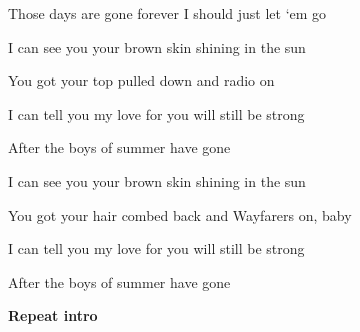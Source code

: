  Those days are gone forever I should just let ‘em go 

 I can see you  your brown skin shining in the sun

You got your top pulled down and  radio on

 I can tell you my  love for you will still be strong

After the boys of  summer have gone

 I can see you  your brown skin shining in the sun

You got your hair combed back and  Wayfarers on, baby

 I can tell you my  love for you will still be strong

After the boys of  summer have gone

\textbf{Repeat intro} 

